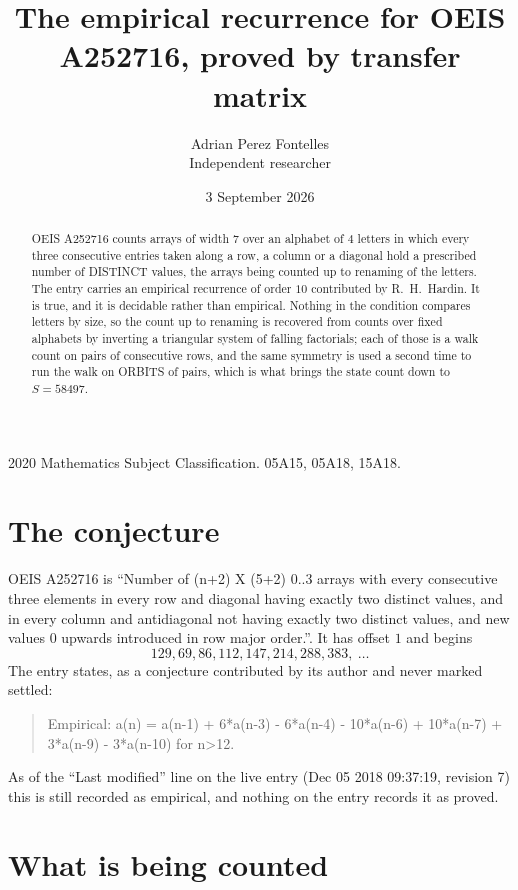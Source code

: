 \documentclass[11pt,a4paper]{article}
\title{The empirical recurrence for OEIS A252716, proved by transfer matrix}
\author{Adrian Perez Fontelles\\ \small Independent researcher}
\date{3 September 2026}
\theoremstyle{plain}
\theoremstyle{definition}
\begin{document}
\maketitle

\begin{abstract}
OEIS A252716 counts arrays of width $7$ over an alphabet of $4$ letters in which every three
consecutive entries taken along a row, a column or a diagonal hold a prescribed number of
DISTINCT values, the arrays being counted up to renaming of the letters. The entry carries an
empirical recurrence of order $10$ contributed by R.~H.~Hardin. It is true, and it is
decidable rather than empirical. Nothing in the condition compares letters by size, so the
count up to renaming is recovered from counts over fixed alphabets by inverting a triangular
system of falling factorials; each of those is a walk count on pairs of consecutive rows, and
the same symmetry is used a second time to run the walk on ORBITS of pairs, which is what
brings the state count down to $S=58497$.
\end{abstract}

\noindent\small 2020 Mathematics Subject Classification. 05A15, 05A18, 15A18.\normalsize

\section{The conjecture}

OEIS A252716 is ``Number of (n+2) X (5+2) 0..3 arrays with every consecutive three elements in every row and diagonal having exactly two distinct values, and in every column and antidiagonal not having exactly two distinct values, and new values 0 upwards introduced in row major order.''. It has offset $1$ and begins
\[
129, 69, 86, 112, 147, 214, 288, 383,\ \dots
\]
The entry states, as a conjecture contributed by its author and never marked settled:
\begin{quote}
Empirical: a(n) = a(n-1) + 6*a(n-3) - 6*a(n-4) - 10*a(n-6) + 10*a(n-7) + 3*a(n-9) - 3*a(n-10) for n>12.
\end{quote}
As of the ``Last modified'' line on the live entry (Dec 05 2018 09:37:19, revision 7) this is still
recorded as empirical, and nothing on the entry records it as proved.

\section{What is being counted}
\end{document}
